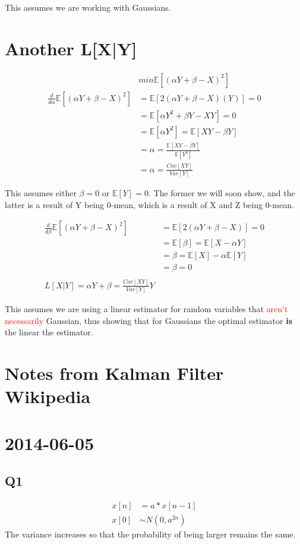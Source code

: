 \documentclass[leqno,twocolumn]{article}
\begin{document}
This assumes we are working with Gaussians.

\section{Another L[X|Y]}
\begin{align*}
& min \mathbb{E}[(\alpha Y + \beta - X)^2]\\
\frac{d}{d\alpha} \mathbb{E}[(\alpha Y + \beta - X)^2] &= \mathbb{E}[2(\alpha Y + \beta - X)(Y)] = 0\\
&= \mathbb{E}[\alpha Y^2 + \beta Y - XY] = 0\\
&= \mathbb{E}[\alpha Y^2] = \mathbb{E}[XY - \beta Y]\\
&= \alpha = \frac{\mathbb{E}[XY-\beta Y]}{\mathbb{E}[Y^2]}\\
&= \alpha = \frac{Cov[XY]}{Var[Y]}
\end{align*}

This assumes either $\beta = 0$ or $\mathbb{E}[Y] = 0$. The former we will soon show, and the latter is a result of Y being 0-mean, which is a result of X and Z being 0-mean.

\begin{align*}
\frac{d}{d\beta} \mathbb{E}[(\alpha Y + \beta - X)^2] &= \mathbb{E}[2(\alpha Y+\beta-X)] = 0\\
&= \mathbb{E}[\beta] = \mathbb{E}[X-\alpha Y]\\
&= \beta = \mathbb{E}[X] - \alpha\mathbb{E}[Y]\\
&= \beta = 0\\
\\
L[X|Y] = \alpha Y + \beta = \frac{Cov[XY]}{Var[Y]}Y
\end{align*}

This assumes we are using a linear estimator for random variables that \textcolor{red}{aren't necessarily} Gaussian, thus showing that for Gaussians the optimal estimator \textbf{is} the linear the estimator.

\section{Notes from Kalman Filter Wikipedia}

\section{2014-06-05}
\subsection{Q1}
\begin{align*}
x[n] &= a*x[n-1]\\
x[0] &\sim N(0,a^{2n})
\end{align*}
The variance increases so that the probability of being larger remains the same.
\end{document}
